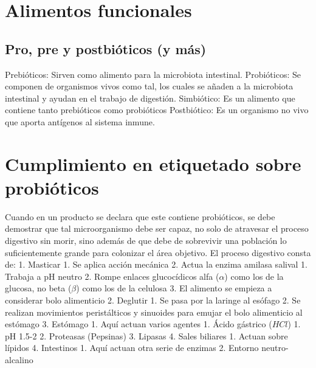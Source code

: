 


\section{Alimentos funcionales}


\subsection{Pro, pre y postbióticos (y más)}

Prebióticos: Sirven como alimento para la microbiota intestinal.
Probióticos: Se componen de organismos vivos como tal, los cuales se añaden a la microbiota intestinal y ayudan en el trabajo de digestión.
Simbiótico: Es un alimento que contiene tanto prebióticos como probióticos
Postbiótico: Es un organismo no vivo que aporta antígenos al sistema inmune.

\section{Cumplimiento en etiquetado sobre probióticos}

Cuando en un producto se declara que este contiene probióticos, se debe demostrar que tal microorganismo debe ser capaz, no solo de atravesar el proceso digestivo sin morir, sino además de que debe de sobrevivir una población lo suficientemente grande para colonizar el área objetivo.
El proceso digestivo consta de:
1. Masticar
	1. Se aplica acción mecánica
	2. Actua la enzima amilasa salival
		1. Trabaja a pH neutro
		2. Rompe enlaces glucocídicos alfa ($\alpha$) como los de la glucosa, no beta ($\beta$) como los de la celulosa
	3. El alimento se empieza a considerar bolo alimenticio
2. Deglutir
	1. Se pasa por la laringe al esófago
	2. Se realizan movimientos peristálticos y sinuoides para emujar el bolo alimenticio al estómago
3. Estómago
	1. Aquí actuan varios agentes
		1. Ácido gástrico ($HCl$)
			1. pH 1.5-2
		2. Proteasas (Pepsinas)
		3. Lipasas
		4. Sales biliares
			1. Actuan sobre lípidos
4. Intestinos
	1. Aquí actuan otra serie de enzimas
	2. Entorno neutro-alcalino